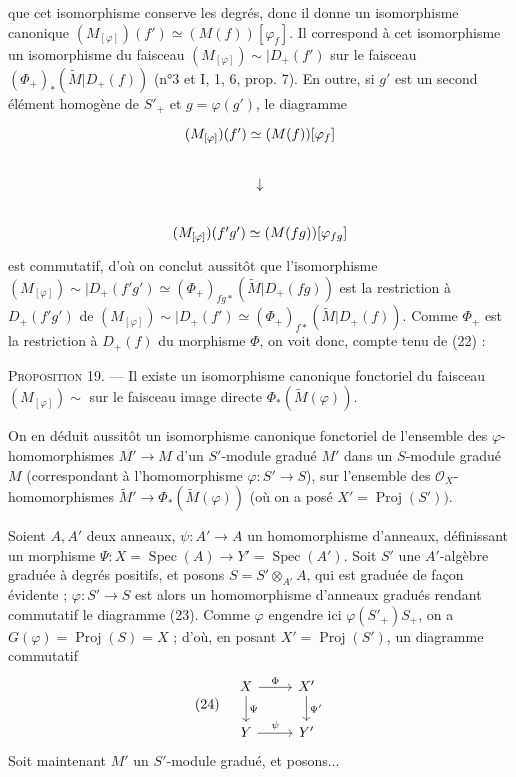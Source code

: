 \newpage


que cet isomorphisme conserve les degrés, donc il donne un isomorphisme canonique $(M_{[\varphi]})(f') \simeq (M(f))[\varphi_f]$. Il correspond à cet isomorphisme un isomorphisme du faisceau $(M_{[\varphi]})\sim|D_+(f')$ sur le faisceau $(\Phi_+)_* (\tilde{M}|D_+(f))$ (n°3 et I, 1, 6, prop. 7). En outre, si $g'$ est un second élément homogène de $S'_+$ et $g = \varphi(g')$, le diagramme
$$\begin{tikzcd}
(M_{[\varphi]})(f') \simeq (M(f))[\varphi_f] \\
\downarrow \\
(M_{[\varphi]})(f'g') \simeq (M(fg))[\varphi_{fg}]
\end{tikzcd}$$
est commutatif, d'où on conclut aussitôt que l'isomorphisme $(M_{[\varphi]})\sim|D_+(f'g') \simeq (\Phi_+)_{fg*} (\tilde{M}|D_+(fg))$ est la restriction à $D_+(f'g')$ de $(M_{[\varphi]})\sim|D_+(f') \simeq (\Phi_+)_{f*} (\tilde{M}|D_+(f))$. Comme $\Phi_+$ est la restriction à $D_+(f)$ du morphisme $\Phi$, on voit donc, compte tenu de (22) :

\textsc{Proposition 19}. — Il existe un isomorphisme canonique fonctoriel du faisceau $(M_{[\varphi]})\sim$ sur le faisceau image directe $\Phi_*(\tilde{M}(\varphi))$.

On en déduit aussitôt un isomorphisme canonique fonctoriel de l'ensemble des $\varphi$-homomorphismes $M' \to M$ d'un $S'$-module gradué $M'$ dans un $S$-module gradué $M$ (correspondant à l'homomorphisme $\varphi : S' \to S$), sur l'ensemble des $\mathcal{O}_X$-homomorphismes $\tilde{M}' \to \Phi_*(\tilde{M}(\varphi))$ (où on a posé $X' = \operatorname{Proj}(S'))$.

Soient $A, A'$ deux anneaux, $\psi : A' \to A$ un homomorphisme d'anneaux, définissant un morphisme $\Psi : X = \operatorname{Spec}(A) \to Y' = \operatorname{Spec}(A')$. Soit $S'$ une $A'$-algèbre graduée à degrés positifs, et posons $S = S' \otimes_{A'} A$, qui est graduée de façon évidente ; $\varphi : S' \to S$ est alors un homomorphisme d'anneaux gradués rendant commutatif le diagramme (23). Comme $\varphi$ engendre ici $\varphi(S'_+)S_+$, on a $G(\varphi) = \operatorname{Proj}(S) = X$ ; d'où, en posant $X' = \operatorname{Proj}(S')$, un diagramme commutatif
$$(24) \quad \begin{tikzcd}
X \arrow[r, "\Phi"] \arrow[d, "\Psi"] & X' \arrow[d, "\Psi'"] \\
Y \arrow[r, "\psi"] & Y'
\end{tikzcd}$$
Soit maintenant $M'$ un $S'$-module gradué, et posons...

